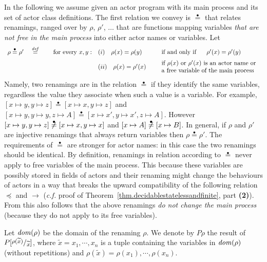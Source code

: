 \documentclass{LMCS}
\theoremstyle{plain}\newtheorem{proposition}[thm]{Proposition}
\theoremstyle{plain}\newtheorem{lemma}[thm]{Lemma}
\theoremstyle{plain}\newtheorem{theorem}[thm]{Theorem}
\theoremstyle{plain}\newtheorem{corollary}[thm]{Corollary}
\newcommand{\subst}[2]{[\raisebox{.5ex}{\footnotesize$#1$}  /
                        \raisebox{-.5ex}{\footnotesize$#2$} ]}
\newcommand{\lred}[1]{\stackrel{#1}{\longrightarrow}}
\newcommand{\eqdef}{\stackrel{{\it def}}{=}}
\newcommand{\dom}[1]{{\it dom}(#1)}
\newcommand{\wt}[1]{\widetilde{#1}}
\newcommand{\eqdot}{\stackrel{\bullet}{=}}
\begin{document}
In the following we assume given an actor program with its 
main process and its set of actor class definitions.
The first relation we convey is $\eqdot$ that relates renamings,
ranged over by $\rho$, $\rho'$, $\ldots$
that are functions mapping variables \emph{that are
not free in the main process} into either actor names or variables.
Let 
{\small
\[
\begin{array}{lrll}
\rho \eqdot \rho' \quad \eqdef \quad & \mbox{ for every } x,y: 
&(i) \quad  
\rho(x) = \rho(y) \quad & \begin{array}{l}
\mbox{if and only if $\quad$ $\rho'(x) = \rho'(y)$} \end{array}
\vspace{2mm}\\
&&(ii) \quad \rho(x) = \rho'(x) \quad & 
\begin{array}{l}
\mbox{if $\rho(x)$ or $\rho'(x)$ is an actor name or}\\
\mbox{a free variable of the main process}
\end{array}
\end{array}
\] }
Namely, two renamings are in the relation $\eqdot$ if they identify the 
same variables, regardless the value they associate when such a value is a 
variable.
For example, $[x \mapsto y, y \mapsto z] \eqdot [x \mapsto x, y \mapsto z]$
and $[x \mapsto y, y \mapsto y, z \mapsto A] \eqdot [x \mapsto x', y \mapsto x',
z \mapsto A]$. However $[x \mapsto y, y \mapsto z] \not \eqdot [x \mapsto x, y \mapsto x]$ and $[x \mapsto A] \not \eqdot [x \mapsto B]$.
In general, if $\rho$ and $\rho'$ are injective renamings that 
always return variables then $\rho \eqdot \rho'$. 
The requirements of $\eqdot$ are stronger for actor names:
in this case the two renamings should be identical.
By definition, renamings in relation according to $\eqdot$
never apply to free variables of the main process.
This because these variables are possibly stored in fields of actors and their
renaming might change the behaviours of actors in a way that breaks the 
upward compatibility of the following relation $\preceq$ and $\lred{}$
(\emph{c.f.} proof of Theorem~\ref{thm.decidablestatelessandfinite}, part 
{\bf (2)}). From this also follows that the above renamings \emph{do not change the
main process} (because they do not apply to its free variables).

Let $\dom{\rho}$ be the domain of the renaming $\rho$. 
We denote by $P\rho$ the result of $P \subst{\rho(\wt{x})}{\wt{x}}$, where 
$\wt{x} = x_1, \cdots, x_n$ is a tuple containing the variables in $\dom{\rho}$ 
(without repetitions) and $\rho(\wt{x}) = \rho(x_1), \cdots, \rho(x_n)$.
\end{document}
